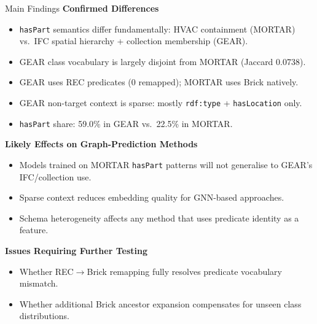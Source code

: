 \documentclass[10pt]{beamer}
\begin{document}
\begin{frame}{Main Findings}
  \textbf{Confirmed Differences}
  \begin{itemize}
    \item \texttt{hasPart} semantics differ fundamentally: HVAC containment (MORTAR) vs.\
          IFC spatial hierarchy + collection membership (GEAR).
    \item GEAR class vocabulary is largely disjoint from MORTAR (Jaccard 0.0738).
    \item GEAR uses REC predicates (0 remapped); MORTAR uses Brick natively.
    \item GEAR non-target context is sparse: mostly \texttt{rdf:type} + \texttt{hasLocation} only.
    \item \texttt{hasPart} share: 59.0\% in GEAR vs.\
          22.5\% in MORTAR.
  \end{itemize}
  \vspace{0.3em}
  \textbf{Likely Effects on Graph-Prediction Methods}
  \begin{itemize}
    \item Models trained on MORTAR \texttt{hasPart} patterns will not generalise to GEAR's
          IFC/collection use.
    \item Sparse context reduces embedding quality for GNN-based approaches.
    \item Schema heterogeneity affects any method that uses predicate identity as a feature.
  \end{itemize}
  \vspace{0.3em}
  \textbf{Issues Requiring Further Testing}
  \begin{itemize}
    \item Whether REC$\to$Brick remapping fully resolves predicate vocabulary mismatch.
    \item Whether additional Brick ancestor expansion compensates for unseen class distributions.
  \end{itemize}
\end{frame}
\end{document}
